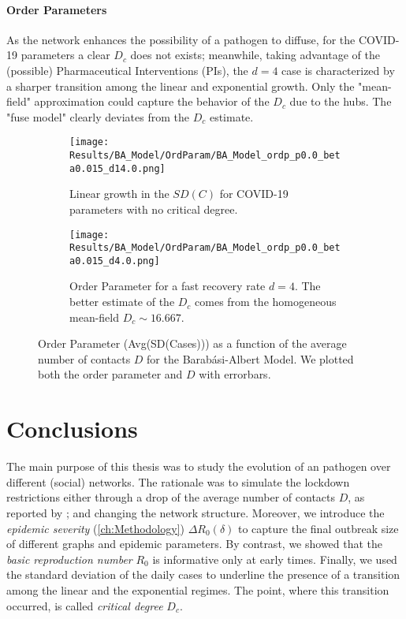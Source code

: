 \documentclass[a4paper,10pt, oneside]{book} %
\theoremstyle{definition}
\begin{document}
\subsubsection*{Order Parameters}
As the network enhances the possibility of a pathogen to diffuse, for the COVID-19 parameters a clear $D_c$ does not exists; meanwhile, taking advantage of the (possible) Pharmaceutical Interventions (PIs), the $d = 4$ case is characterized by a sharper transition among the linear and exponential growth. Only the "mean-field" approximation could capture the behavior of the $ D_c$ due to the hubs. The "fuse model" clearly deviates from the $ D_c$ estimate. 
\begin{figure}[t]
	\begin{subfigure}[t]{0.48\linewidth}
		\centering
		\texttt{[image: Results/BA\_Model/OrdParam/BA\_Model\_ordp\_p0.0\_beta0.015\_d14.0.png]}
		\caption{Linear growth in the $SD(C)$ for COVID-19 parameters with no critical degree.}
		\label{fig:Ordp_BA_d14}
	\end{subfigure}
	\hfill
	\begin{subfigure}[t]{0.48\linewidth}
		\centering
		\texttt{[image: Results/BA\_Model/OrdParam/BA\_Model\_ordp\_p0.0\_beta0.015\_d4.0.png]}
		\caption{Order Parameter for a fast recovery rate $ d = 4$. The better estimate of the $ D_c$ comes from the homogeneous mean-field $ D_c \sim 16.667$.}
		\label{fig:Ordp_BA_COVID_d1}
	\end{subfigure}
	\caption{Order Parameter (Avg(SD(Cases))) as a function of the average number of contacts $ D$ for the Barabási-Albert Model. We plotted both the order parameter and $D$ with errorbars.}
	\label{fig:Ordp_BA_COVID}
\end{figure}


\chapter{Conclusions}
The main purpose of this thesis was to study the evolution of an pathogen over different (social) networks. The rationale was to simulate the lockdown restrictions either through a drop of the average number of contacts $D$, as reported by \cite{Liu::2021_Review_SContactPattern}; and changing the network structure. Moreover, we introduce the \textit{epidemic severity} (\autoref{ch:Methodology}) $ \Delta R_0 (\delta)$ to capture the final outbreak size of different graphs and epidemic parameters. By contrast, we showed that the \textit{basic reproduction number} $ R_0 $ is informative only at early times.
Finally, we used the standard deviation of the daily cases to underline the presence of a transition among the linear and the exponential regimes. The point, where this transition occurred, is called \textit{critical degree}  $D_c$.
\end{document}
